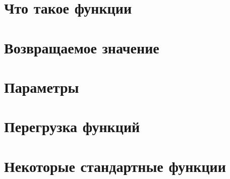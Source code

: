 \documentclass[book.tex]{subfiles}
\begin{document}



\maketitle

\section*{Что такое функции}

\section*{Возвращаемое значение}

\section*{Параметры}

\section*{Перегрузка функций}

\section*{Некоторые стандартные функции}
\end{document}
